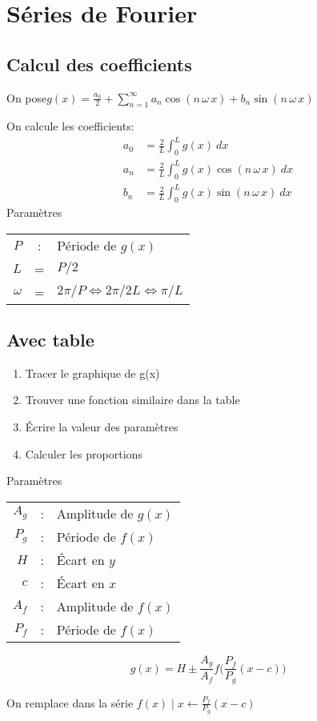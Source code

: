 \section{Séries de Fourier}
\subsection{Calcul des coefficients}

On pose\hspace{1em}\(
  g(x) = \frac{a_0}{2} + \sum_{n=1}^{\infty} a_n \cos(n\,\omega\,x) +b_n \sin(n\, \omega \,x)
\)\\
\raggedright
On calcule les coefficients:
\begin{align*}
  a_0 &= \frac{2}{L} \int^L_0 g(x) \:dx \\
  a_n &= \frac{2}{L} \int^L_0 g(x)\cos(n\,\omega\,x) \:dx \\
  b_n &= \frac{2}{L} \int^L_0 g(x)\sin(n\,\omega\,x) \:dx
\end{align*}
Paramètres
\begin{tabular}{rcl}
$P$ & : & Période de $g(x)$\\
$L$ & = & $P / 2$\\
$\omega$ & = & $2\pi / P \Leftrightarrow 2\pi/2L \Leftrightarrow  \pi/L$ 
\end{tabular}

\subsection{Avec table}

\begin{enumerate}[nosep]
  \item Tracer le graphique de g(x)
  \item Trouver une fonction similaire dans la table
  \item Écrire la valeur des paramètres
  \item Calculer les proportions
\end{enumerate}

Paramètres
\begin{tabular}{rcl}
\(A_g\) & : & Amplitude de \(g(x)\)\\
\(P_g\) & : & Période de \(f(x)\)\\
\(H\) & : & Écart en \(y\)\\
\(c\) & : & Écart en \(x\)\\
\(A_f\) & : & Amplitude de \( f(x) \)\\
\(P_f\) & : & Période de \(f(x)\)
\end{tabular}

\begin{equation*}
  g(x)= H \pm \frac{A_g}{A_f} f\bigg( \frac{P_f}{P_g} (x-c) \bigg)
\end{equation*}

On remplace dans la série \( f(x) \mid x \leftarrow \frac{P_f}{P_g} (x-c) \)
